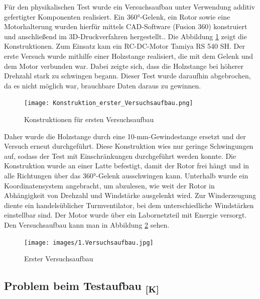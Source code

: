 \documentclass[a4paper,12pt]{article}
\begin{document}
Für den physikalischen Test wurde ein Versuchsaufbau unter Verwendung additiv gefertigter Komponenten realisiert. Ein 360°-Gelenk, ein Rotor sowie eine Motorhalterung wurden hierfür mittels CAD-Software (Fusion 360) konstruiert und anschließend im 3D-Druckverfahren hergestellt.. Die Abbildung \ref{fig:Konstruktionen erster Versuchsaufbau} zeigt die Konstruktionen. Zum Einsatz kam ein RC-DC-Motor Tamiya RS 540 SH.\cite{Datenblatt_Brushed_Motor} \newline
Der erste Versuch wurde mithilfe einer Holzstange realisiert, die mit dem Gelenk und dem Motor verbunden war. Dabei zeigte sich, dass die Holzstange bei höherer Drehzahl stark zu schwingen begann. Dieser Test wurde daraufhin abgebrochen, da es nicht möglich war, brauchbare Daten daraus zu gewinnen.

\begin{figure}[H]
    \centering
    \texttt{[image: Konstruktion\_erster\_Versuchsaufbau.png]}
    \caption{Konstruktionen für ersten Versuchsaufbau}
    \label{fig:Konstruktionen erster Versuchsaufbau}
\end{figure}

Daher wurde die Holzstange durch eine 10-mm-Gewindestange ersetzt und der Versuch erneut durchgeführt. Diese Konstruktion wies nur geringe Schwingungen auf, sodass der Test mit Einschränkungen durchgeführt werden konnte.
Die Konstruktion wurde an einer Latte befestigt, damit der Rotor frei hängt und in alle Richtungen über das 360°-Gelenk ausschwingen kann. Unterhalb wurde ein Koordinatensystem angebracht, um abzulesen, wie weit der Rotor in Abhängigkeit von Drehzahl und Windstärke ausgelenkt wird.
Zur Winderzeugung diente ein handelsüblicher Turmventilator, bei dem unterschiedliche Windstärken einstellbar sind. Der Motor wurde über ein Labornetzteil mit Energie versorgt. Den Versuchsaufbau kann man in Abbildung \ref{fig:1.Versuchsaufbau} sehen.\newline


\begin{figure}[H]
    \centering
    \texttt{[image: images/1.Versuchsaufbau.jpg]}
    \caption{Erster Versuchsaufbau}
    \label{fig:1.Versuchsaufbau}
\end{figure}

\subsection{\texorpdfstring{Problem beim Testaufbau \textsubscript{[K]}}{Problem beim Testaufbau [K]}}
\end{document}
